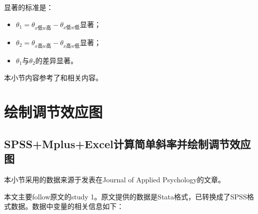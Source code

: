 \documentclass[
]{book}
\begin{document}
显著的标准是：

\begin{itemize}
\item
  \(\theta_{1}=\theta_{x低w高}-\theta_{x低w低}\)显著；
\item
  \(\theta_{2}=\theta_{x高w高}-\theta_{x高w低}\)显著；
\item
  \(\theta_{1}\)与\(\theta_{2}\)的差异显著。
\end{itemize}

本小节内容参考了\autocite{Lin2017:RNG}和\autocite{Hu2019:RNG}相关内容。

\hypertarget{modplot}{%
\section{绘制调节效应图}\label{modplot}}

\hypertarget{spssmplusexcelux8ba1ux7b97ux7b80ux5355ux659cux7387ux5e76ux7ed8ux5236ux8c03ux8282ux6548ux5e94ux56fe}{%
\subsection{SPSS+Mplus+Excel计算简单斜率并绘制调节效应图}\label{spssmplusexcelux8ba1ux7b97ux7b80ux5355ux659cux7387ux5e76ux7ed8ux5236ux8c03ux8282ux6548ux5e94ux56fe}}

本小节采用的数据来源于发表在Journal of Applied Psychology的文章\autocite{Liu2020:RNG}。

本文主要follow原文的study 1。原文提供的数据是Stata格式，已转换成了SPSS格式数据。数据中变量的相关信息如下：
\end{document}

